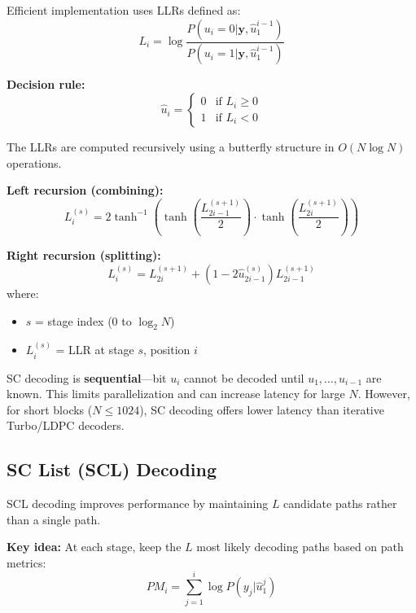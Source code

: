 Efficient implementation uses LLRs defined as:
\begin{equation}
L_i = \log \frac{P(u_i=0 | \mathbf{y}, \hat{u}_1^{i-1})}{P(u_i=1 | \mathbf{y}, \hat{u}_1^{i-1})}
\end{equation}

\textbf{Decision rule:}
\begin{equation}
\hat{u}_i = \begin{cases}
0 & \text{if } L_i \geq 0 \\
1 & \text{if } L_i < 0
\end{cases}
\end{equation}

The LLRs are computed recursively using a butterfly structure in $O(N \log N)$ operations.

\textbf{Left recursion (combining):}
\begin{equation}
L_i^{(s)} = 2 \tanh^{-1}\left(\tanh\left(\frac{L_{2i-1}^{(s+1)}}{2}\right) \cdot \tanh\left(\frac{L_{2i}^{(s+1)}}{2}\right)\right)
\end{equation}

\textbf{Right recursion (splitting):}
\begin{equation}
L_i^{(s)} = L_{2i}^{(s+1)} + (1 - 2\hat{u}_{2i-1}^{(s)}) L_{2i-1}^{(s+1)}
\end{equation}
where:
\begin{itemize}
\item $s$ = stage index ($0$ to $\log_2 N$)
\item $L_i^{(s)}$ = LLR at stage $s$, position $i$
\end{itemize}

\begin{warningbox}
SC decoding is \textbf{sequential}---bit $u_i$ cannot be decoded until $u_1, \ldots, u_{i-1}$ are known. This limits parallelization and can increase latency for large $N$. However, for short blocks ($N \leq 1024$), SC decoding offers lower latency than iterative Turbo/LDPC decoders.
\end{warningbox}

\subsection{SC List (SCL) Decoding}

SCL decoding improves performance by maintaining $L$ candidate paths rather than a single path.

\textbf{Key idea:} At each stage, keep the $L$ most likely decoding paths based on path metrics:
\begin{equation}
PM_i = \sum_{j=1}^{i} \log P(y_j | \hat{u}_1^j)
\end{equation}

